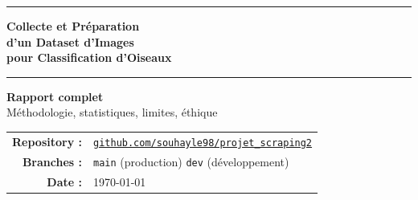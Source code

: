 \documentclass[12pt,a4paper]{article}
\begin{document}

\begin{titlepage}
  \begin{center}
    \vspace*{1.5cm}
    {\color{primary}\rule{\linewidth}{2pt}}
    \vspace{0.6cm}
    {\Huge\bfseries\color{primary}
      Collecte et Préparation\\[0.3em]
      d'un Dataset d'Images\\[0.3em]
      pour Classification d'Oiseaux}
    \vspace{0.4cm}
    {\color{primary}\rule{\linewidth}{2pt}}
    \vspace{1.2cm}

    \begin{tcolorbox}[colback=lightblue, colframe=primary, arc=6pt,
                      boxrule=1pt, width=0.85\linewidth]
      \centering
      {\large\bfseries Rapport complet}\\[0.4em]
      {\normalsize Méthodologie, statistiques, limites, éthique}
    \end{tcolorbox}

    \vspace{2cm}
    \begin{tabular}{rl}
      \textbf{Repository :} & \href{https://github.com/souhayle98/projet_scraping2}
                              {\color{secondary}\texttt{github.com/souhayle98/projet\_scraping2}} \\[0.4em]
      \textbf{Branches :}   & \texttt{main} (production) \quad \texttt{dev} (développement) \\[0.4em]
      \textbf{Date :}       & \today \\[0.4em]
    \end{tabular}


\end{center}
\end{titlepage}
\end{document}
